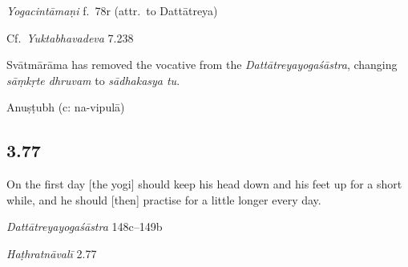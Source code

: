 \begin{ekdosis}
\begin{testimonia}[hp03_076]
\emph{Yogacintāmaṇi} f.~78r (attr.~to Dattātreya)
\begin{versinnote}
\end{versinnote}

Cf.~\emph{Yuktabhavadeva} 7.238
\begin{versinnote}
\end{versinnote}
\end{testimonia}

\begin{philcomm}[hp03_076]
Svātmārāma has removed the vocative from the \emph{Dattātreyayogaśāstra}, changing \emph{sāṃkṛte dhruvam} to \emph{sādhakasya tu}.
\end{philcomm}

\begin{metre}[hp03_076]
Anuṣṭubh (c: na-vipulā)
\end{metre}

\subsection*{3.77}
\begin{translation}[hp03_077]
On the first day [the yogi] should keep his head down and his feet up for a short while, and he should [then] practise for a little longer every day.
\end{translation}

\begin{sources}[hp03_077]
\emph{Dattātreyayogaśāstra} 148c–149b
\begin{versinnote}
\end{versinnote}
\end{sources}

\begin{testimonia}[hp03_077]
\emph{Haṭhratnāvalī} 2.77
\begin{versinnote}
\tl{\var{cordhvapādau ] cordhvapādaḥ \vl}\\!}
\end{versinnote}


\end{testimonia}
\end{ekdosis}
